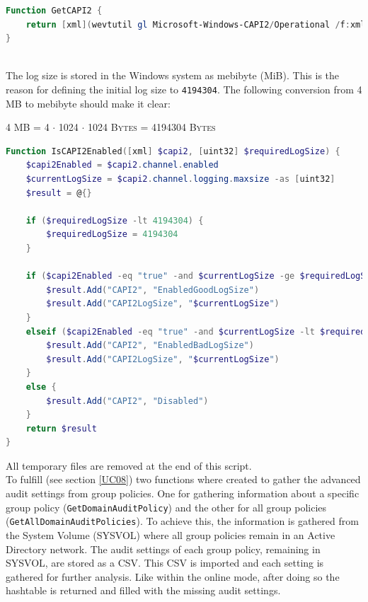 \begin{lstlisting}[caption=Function GetCAPI2, language=PowerShell]
Function GetCAPI2 {
    return [xml](wevtutil gl Microsoft-Windows-CAPI2/Operational /f:xml)
}
\end{lstlisting}\ \\
The log size is stored in the Windows system as mebibyte (MiB). This is the reason for defining the initial log size to \lstinline|4194304|. The following conversion from 4 MB to mebibyte should make it clear:
\begin{center}
    \textsc{4 MB = 4 $\cdot$ 1024 $\cdot$ 1024 Bytes = 4194304 Bytes }
\end{center}
\begin{lstlisting}[caption=Function IsCAPI2Enabled, language=PowerShell]
Function IsCAPI2Enabled([xml] $capi2, [uint32] $requiredLogSize) {
    $capi2Enabled = $capi2.channel.enabled
    $currentLogSize = $capi2.channel.logging.maxsize -as [uint32]
    $result = @{}

    if ($requiredLogSize -lt 4194304) {
        $requiredLogSize = 4194304
    }

    if ($capi2Enabled -eq "true" -and $currentLogSize -ge $requiredLogSize) {
        $result.Add("CAPI2", "EnabledGoodLogSize")
        $result.Add("CAPI2LogSize", "$currentLogSize")
    }
    elseif ($capi2Enabled -eq "true" -and $currentLogSize -lt $requiredLogSize) {
        $result.Add("CAPI2", "EnabledBadLogSize")
        $result.Add("CAPI2LogSize", "$currentLogSize")
    }
    else {
        $result.Add("CAPI2", "Disabled")
    }
    return $result
}  
\end{lstlisting}
All temporary files are removed at the end of this script.
\clearpage \ \\
To fulfill  (see section \ref{UC08}) two functions where created to gather the advanced audit settings from group policies. One for gathering information about a specific group policy (\lstinline|GetDomainAuditPolicy|) and the other for all group policies (\lstinline|GetAllDomainAuditPolicies|). To achieve this, the information is gathered from the System Volume (SYSVOL) where all group policies remain in an Active Directory network. The audit settings of each group policy, remaining in SYSVOL, are stored as a CSV. This CSV is imported and each setting is gathered for further analysis. Like within the online mode, after doing so the hashtable is returned and filled with the missing audit settings. 

